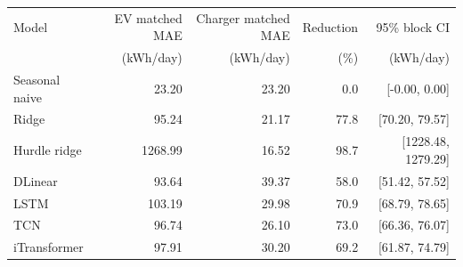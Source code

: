 \begin{tabular}{lrrrr}
\toprule
Model & EV matched MAE & Charger matched MAE & Reduction & 95\% block CI \\
 & (kWh/day) & (kWh/day) & (\%) & (kWh/day) \\
\midrule
Seasonal naive & 23.20 & 23.20 & 0.0 & [-0.00, 0.00] \\
Ridge & 95.24 & 21.17 & 77.8 & [70.20, 79.57] \\
Hurdle ridge & 1268.99 & 16.52 & 98.7 & [1228.48, 1279.29] \\
DLinear & 93.64 & 39.37 & 58.0 & [51.42, 57.52] \\
LSTM & 103.19 & 29.98 & 70.9 & [68.79, 78.65] \\
TCN & 96.74 & 26.10 & 73.0 & [66.36, 76.07] \\
iTransformer & 97.91 & 30.20 & 69.2 & [61.87, 74.79] \\
\bottomrule
\end{tabular}
